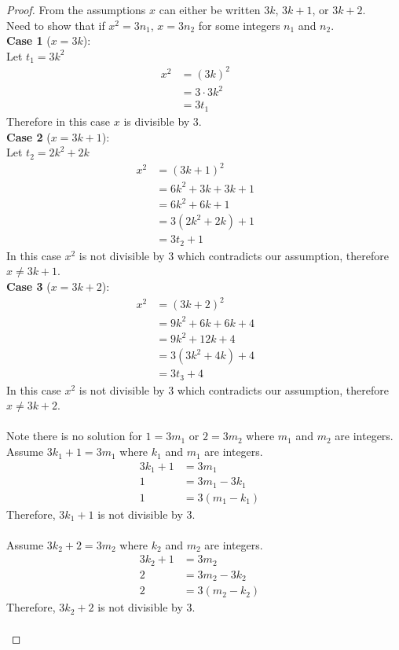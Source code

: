 \begin{proof}
From the assumptions $x$ can either be 
written $3k$, $3k + 1$, or $3k + 2$. \\
Need to show that if $x^2 = 3n_1$, $x = 3n_2$ for 
some integers $n_1$ and $n_2$. \\
\textbf{Case 1} ($x = 3k$): \\
Let $t_1 = 3k^2$
\begin{align*}
x^2 &= {(3k)}^2 && \\
&= 3 \cdot 3k^2 && \\
&= 3 t_1
\end{align*}
Therefore in this case $x$ is divisible by $3$. \\
\textbf{Case 2} ($x = 3k + 1$): \\
Let $t_2 = 2k^2 + 2k$
\begin{align*}
x^2 &= {(3k + 1)}^2 && \\
&= 6k^2 + 3k + 3k + 1 && \\
&= 6k^2 + 6k + 1&& \\
&= 3(2k^2 + 2k) + 1 && \\
&= 3t_2 + 1
\end{align*}
In this case $x^2$ is not divisible by $3$ which contradicts
our assumption, therefore $x \not = 3k + 1$. \\
\textbf{Case 3} ($x = 3k + 2$): \\
\begin{align*}
x^2 &= {(3k + 2)}^2 && \\
&= 9k^2 + 6k + 6k + 4 && \\
&= 9k^2 + 12k + 4 && \\
&= 3(3k^2 + 4k) + 4 && \\
&= 3t_3+ 4 
\end{align*}
In this case $x^2$ is not divisible by $3$ which contradicts
our assumption, therefore $x \not = 3k + 2$. \\ \\

Note there is no solution for $1 = 3m_1$ or $2 = 3m_2$ 
where $m_1$ and $m_2$ are integers. \\
Assume $3k_1 + 1 = 3m_1$ where $k_1$ and $m_1$ are integers. \\
\begin{align*}
3k_1 + 1 &= 3m_1 & \\
1 &= 3m_1 - 3k_1 & \\
1 &= 3(m_1 - k_1) 
\end{align*}
Therefore, $3k_1 + 1$ is not divisible by 3. \\ \\
Assume $3k_2 + 2 = 3m_2$ where $k_2$ and $m_2$ are integers. \\
\begin{align*}
3k_2 + 1 &= 3m_2 & \\
2 &= 3m_2 - 3k_2 & \\
2 &= 3(m_2 - k_2)
\end{align*}
Therefore, $3k_2 + 2$ is not divisible by 3. \\ \\
\end{proof}

